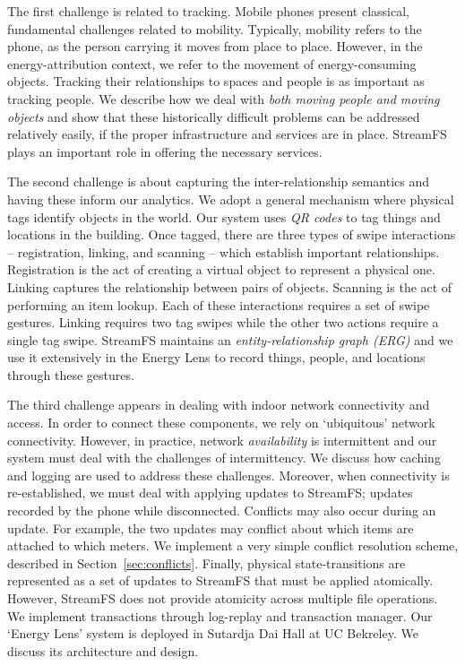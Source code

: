 The first challenge is related to tracking.  Mobile phones present classical, fundamental challenges related to mobility.  Typically, mobility
refers to the phone, as the person carrying it moves from place to place.  However, in the energy-attribution
context, we refer to the movement of energy-consuming objects.  Tracking their relationships to spaces 
and people is as important as tracking people.  We describe how we deal with \emph{both moving people and 
moving objects} and show that these historically difficult problems can be addressed relatively easily, if the proper infrastructure 
and services are in place.  StreamFS plays an important role in offering the necessary services.

The second challenge is about capturing the inter-relationship semantics and having these inform our analytics.
We adopt a general mechanism where physical tags identify objects in the world.  Our system uses \emph{QR codes} to tag things and locations 
in the building.  
Once tagged, there are three types of swipe interactions -- 
registration, linking, and scanning -- which establish important relationships.  Registration is the act of creating a virtual object 
to represent a physical one.  Linking captures the relationship between pairs of objects.  Scanning is the act of performing an item lookup.
Each of these interactions requires a set of swipe gestures.  Linking requires two tag swipes while the other two actions
require a single tag swipe.  StreamFS maintains an \emph{entity-relationship graph (ERG)} and we use it 
extensively in the Energy Lens to record things, people, and locations through these gestures.

The third challenge appears in dealing with indoor network connectivity and access.
In order to connect these components, we rely on `ubiquitous' network connectivity.  However, in practice, network
\emph{availability} is intermittent and our system must deal with the challenges of intermittency.  We discuss how caching
and logging are used to address these challenges.  Moreover, when connectivity is re-established, we must deal with
applying updates to StreamFS; updates recorded by the phone while disconnected.  
Conflicts may also occur during an update.  For example, the two updates may conflict about which items are attached
to which meters.  We implement a very simple conflict resolution scheme, described in Section~\ref{sec:conflicts}.
Finally, physical state-transitions are represented as a set of updates to StreamFS that must be applied 
atomically.  However, StreamFS does not provide atomicity across multiple file operations.  We implement transactions through 
log-replay and transaction manager.  Our `Energy Lens' system is deployed in Sutardja Dai Hall at UC Bekreley.  We discuss
its architecture and design.  
  
